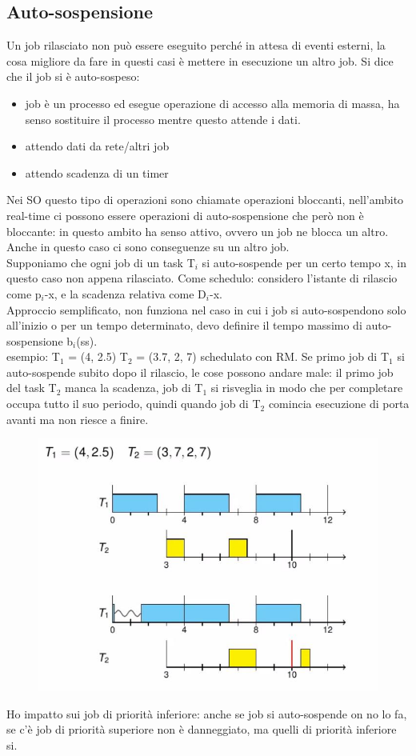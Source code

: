 \documentclass[12pt, oneside]{extbook}
\begin{document}
\subsection{Auto-sospensione}
Un job rilasciato non può essere eseguito perché in attesa di eventi esterni, la cosa migliore da fare in questi casi è mettere in esecuzione un altro job. Si dice che il job si è auto-sospeso:
\begin{itemize}
\item job è un processo ed esegue operazione di accesso alla memoria di massa, ha senso sostituire il processo mentre questo attende i dati.
\item attendo dati da rete/altri job
\item attendo scadenza di un timer
\end{itemize}
Nei SO questo tipo di operazioni sono chiamate operazioni bloccanti, nell'ambito real-time ci possono essere operazioni di auto-sospensione che però non è bloccante: in questo ambito ha senso attivo, ovvero un job ne blocca un altro. Anche in questo caso ci sono conseguenze su un altro job.\\ Supponiamo che ogni job di un task T$_{i}$ si auto-sospende per un certo tempo x, in questo caso non appena rilasciato. Come schedulo: considero l'istante di rilascio come p$_{i}$-x, e la scadenza relativa come D$_{i}$-x.\\ Approccio semplificato, non funziona nel caso in cui i job si auto-sospendono solo all'inizio o per un tempo determinato, devo definire il tempo massimo di auto-sospensione b$_{i}$(ss).\\ esempio: T$_{1}$ = (4, 2.5) T$_{2}$ = (3.7, 2, 7) schedulato con RM. Se primo job di T$_{1}$ si auto-sospende subito dopo il rilascio, le cose possono andare male: il primo job del task T$_{2}$ manca la scadenza, job di T$_{1}$ si risveglia in modo che per completare occupa tutto il suo periodo, quindi quando job di T$_{2}$ comincia esecuzione di porta avanti ma non riesce a finire.\\
\begin{figure}[!h]
\centering
\includegraphics[scale=0.4]{immagini/image-004.jpg}
\end{figure}
Ho impatto sui job di priorità inferiore: anche se job si auto-sospende on no lo fa, se c'è job di priorità superiore non è danneggiato, ma quelli di priorità inferiore si.
\end{document}
